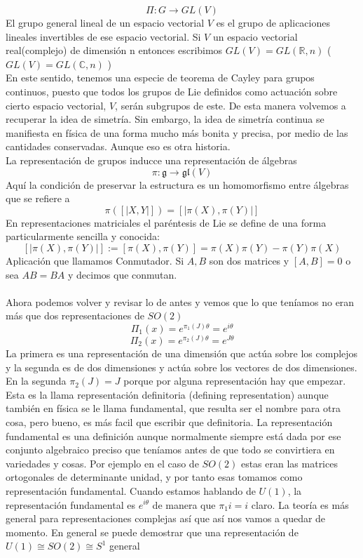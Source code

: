 \documentclass[12pt]{article}
\begin{document}
\begin{equation}
    \Pi: G\longrightarrow GL(V)
\end{equation}
El grupo general lineal de un espacio vectorial $V$ es el grupo de aplicaciones lineales invertibles de ese espacio vectorial. Si $V$ un espacio vectorial real(complejo) de dimensión n entonces escribimos 
$GL(V)=GL(\mathbb{R},n)$ ($GL(V)=GL(\mathbb{C},n)$ )\\
En este sentido, tenemos una especie de teorema de Cayley para grupos continuos, puesto que todos los grupos de Lie definidos como actuación sobre cierto espacio vectorial, $V$, serán subgrupos de este. De esta manera volvemos a recuperar la idea de simetría. Sin embargo, la idea de simetría continua se manifiesta en física de una forma mucho más bonita y precisa, por medio de las cantidades conservadas. Aunque eso es otra historia.\\
La representación de grupos inducce una representación de álgebras
\begin{equation}
    \pi : \mathfrak{g}\rightarrow\mathfrak{g}\mathfrak{l}(V)
\end{equation}
Aquí la condición de preservar la estructura es un homomorfismo entre álgebras que se refiere a
\begin{equation}
    \pi([|X,Y|])=[|\pi(X),\pi(Y)|]
\end{equation}
En representaciones matriciales el paréntesis de Lie se define de una forma particularmente sencilla y conocida:
$$[|\pi(X),\pi(Y)|]:=[\pi(X),\pi(Y)]=\pi(X)\pi(Y)-\pi(Y)\pi(X)$$
Aplicación que llamamos Conmutador. Si $A,B$ son dos matrices y $[A,B]=0$ o sea $AB=BA$ y decimos que conmutan. \\\\
Ahora podemos volver y revisar lo de antes y vemos que lo que teníamos no eran más que dos representaciones de $SO(2)$ 
\begin{equation}
    \Pi_1(x)=e^{\pi_1(J) \theta}=e^{i\theta}
\end{equation}
\begin{equation}
    \Pi_2(x)=e^{\pi_2(J) \theta}=e^{J\theta}
\end{equation}
La primera es una representación de una dimensión que actúa sobre los complejos y la segunda es de dos dimensiones y actúa sobre los vectores de dos dimensiones. En la segunda $\pi_2(J)=J$ porque por alguna representación hay que empezar. Esta es la llama representación definitoria (defining representation) aunque también en física se le llama fundamental, que resulta ser el nombre para otra cosa, pero bueno, es más facil que escribir que definitoria. La representación fundamental es una definición aunque normalmente siempre está dada por ese conjunto algebraico preciso que teníamos antes de que todo se convirtiera en variedades y cosas. Por ejemplo en el caso de $SO(2)$ estas eran las matrices ortogonales de determinante unidad, y por tanto esas tomamos como representación fundamental. Cuando estamos hablando de $U(1)$, la representación fundamental es $e^{i\theta}$ de manera que $\pi_1{i}=i$ claro. La teoría es más general para representaciones complejas así que así nos vamos a quedar de momento. En general se puede demostrar que una representación de $U(1)\cong SO(2)\cong S^1$ general  
\end{document}
